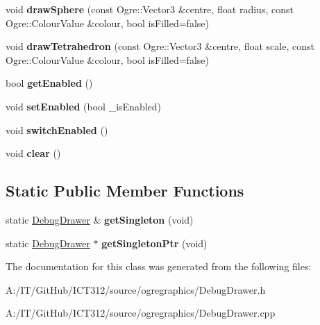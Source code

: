 \begin{DoxyCompactItemize}
\item 
\hypertarget{class_debug_drawer_ab40cd48a32e8577cf9eed6197c3f1929}{void {\bfseries draw\-Sphere} (const Ogre\-::\-Vector3 \&centre, float radius, const Ogre\-::\-Colour\-Value \&colour, bool is\-Filled=false)}\label{class_debug_drawer_ab40cd48a32e8577cf9eed6197c3f1929}

\item 
\hypertarget{class_debug_drawer_aaa8da061a80b0aceab062dd9217c75e5}{void {\bfseries draw\-Tetrahedron} (const Ogre\-::\-Vector3 \&centre, float scale, const Ogre\-::\-Colour\-Value \&colour, bool is\-Filled=false)}\label{class_debug_drawer_aaa8da061a80b0aceab062dd9217c75e5}

\item 
\hypertarget{class_debug_drawer_a01792a65e18f16a8eab3b5bb81095467}{bool {\bfseries get\-Enabled} ()}\label{class_debug_drawer_a01792a65e18f16a8eab3b5bb81095467}

\item 
\hypertarget{class_debug_drawer_a345e07f6bf1c6f159f09907dcfe1c07f}{void {\bfseries set\-Enabled} (bool \-\_\-is\-Enabled)}\label{class_debug_drawer_a345e07f6bf1c6f159f09907dcfe1c07f}

\item 
\hypertarget{class_debug_drawer_ac482f4d2f6be3b5037988594f1fd41eb}{void {\bfseries switch\-Enabled} ()}\label{class_debug_drawer_ac482f4d2f6be3b5037988594f1fd41eb}

\item 
\hypertarget{class_debug_drawer_a7a10010490fdeba658aad0b040750e24}{void {\bfseries clear} ()}\label{class_debug_drawer_a7a10010490fdeba658aad0b040750e24}

\end{DoxyCompactItemize}
\subsection*{Static Public Member Functions}
\begin{DoxyCompactItemize}
\item 
\hypertarget{class_debug_drawer_a0a8f7a51871ed9e45add15e03379c7bd}{static \hyperlink{class_debug_drawer}{Debug\-Drawer} \& {\bfseries get\-Singleton} (void)}\label{class_debug_drawer_a0a8f7a51871ed9e45add15e03379c7bd}

\item 
\hypertarget{class_debug_drawer_a71ac854db9068c93c7e08a02033c7f3f}{static \hyperlink{class_debug_drawer}{Debug\-Drawer} $\ast$ {\bfseries get\-Singleton\-Ptr} (void)}\label{class_debug_drawer_a71ac854db9068c93c7e08a02033c7f3f}

\end{DoxyCompactItemize}


The documentation for this class was generated from the following files\-:\begin{DoxyCompactItemize}
\item 
A\-:/\-I\-T/\-Git\-Hub/\-I\-C\-T312/source/ogregraphics/Debug\-Drawer.\-h\item 
A\-:/\-I\-T/\-Git\-Hub/\-I\-C\-T312/source/ogregraphics/Debug\-Drawer.\-cpp\end{DoxyCompactItemize}
